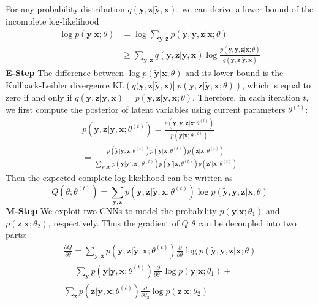 \documentclass[10pt,twocolumn,letterpaper]{article}
\def\vec{\mathbf}
\begin{document}
For any probability distribution $q(\vec{y}, \vec{z} | \tilde{\vec{y}}, \vec{x})$, we can derive a lower bound of the incomplete log-likelihood
\begin{equation}
\begin{aligned}
    \log p(\tilde{\vec{y}} | \vec{x}; \theta) &= \log \sum_{\vec{y},\vec{z}} p(\tilde{\vec{y}}, \vec{y}, \vec{z} | \vec{x}; \theta) \\
    &\geq \sum_{\vec{y},\vec{z}} q(\vec{y}, \vec{z} | \tilde{\vec{y}}, \vec{x}) \log \frac{p(\tilde{\vec{y}}, \vec{y}, \vec{z} | \vec{x}; \theta)}{q(\vec{y}, \vec{z} | \tilde{\vec{y}}, \vec{x})}
\end{aligned}
\end{equation}
\textbf{E-Step} The difference between $\log p(\tilde{\vec{y}} | \vec{x}; \theta)$ and its lower bound is the Kullback-Leibler divergence $\mathrm{KL}\left(q(\vec{y}, \vec{z} | \tilde{\vec{y}}, \vec{x}) || p(\vec{y}, \vec{z} | \tilde{\vec{y}}, \vec{x}; \theta)\right)$, which is equal to zero if and only if $q(\vec{y}, \vec{z} | \tilde{\vec{y}}, \vec{x}) = p(\vec{y}, \vec{z} | \tilde{\vec{y}}, \vec{x}; \theta)$. Therefore, in each iteration $t$, we first compute the posterior of latent variables using current parameters $\theta^{(t)}$:
\begin{multline} \label{eq:posterior}
    p(\vec{y}, \vec{z} | \tilde{\vec{y}}, \vec{x}; \theta^{(t)}) = \frac{p(\tilde{\vec{y}}, \vec{y}, \vec{z} | \vec{x}; \theta^{(t)})}{p(\tilde{\vec{y}} | \vec{x}; \theta^{(t)})} \\
    = \frac{p(\tilde{\vec{y}}|\vec{y},\vec{z};\theta^{(t)}) p(\vec{y}|\vec{x};\theta^{(t)}) p(\vec{z}|\vec{x};\theta^{(t)})}{\sum_{\vec{y}',\vec{z}'} p(\tilde{\vec{y}}|\vec{y}',\vec{z}';\theta^{(t)}) p(\vec{y}'|\vec{x};\theta^{(t)}) p(\vec{z}'|\vec{x};\theta^{(t)})}
\end{multline}
Then the expected complete log-likelihood can be written as
\begin{equation}
    Q(\theta; \theta^{(t)}) = \sum_{\vec{y},\vec{z}} p(\vec{y}, \vec{z} | \tilde{\vec{y}}, \vec{x}; \theta^{(t)}) \log p(\tilde{\vec{y}}, \vec{y}, \vec{z} | \vec{x}; \theta)
\end{equation}
\textbf{M-Step} We exploit two CNNs to model the probability $p(\vec{y}|\vec{x};\theta_1)$ and $p(\vec{z}|\vec{x};\theta_2)$, respectively. Thus the gradient of $Q$ \wrt $\theta$ can be decoupled into two parts:
\begin{multline} \label{eq:gradient}
    \frac{\partial Q}{\partial \theta} = \sum_{\vec{y},\vec{z}} p(\vec{y}, \vec{z} | \tilde{\vec{y}}, \vec{x}; \theta^{(t)}) \frac{\partial}{\partial \theta} \log p(\tilde{\vec{y}}, \vec{y}, \vec{z} | \vec{x}; \theta) \\
    = \sum_{\vec{y}} p(\vec{y} | \tilde{\vec{y}}, \vec{x}; \theta^{(t)}) \frac{\partial}{\partial \theta_1} \log p(\vec{y}|\vec{x};\theta_1) + \\
      \sum_{\vec{z}} p(\vec{z} | \tilde{\vec{y}}, \vec{x}; \theta^{(t)}) \frac{\partial}{\partial \theta_2} \log p(\vec{z}|\vec{x};\theta_2)
\end{multline}
\end{document}
